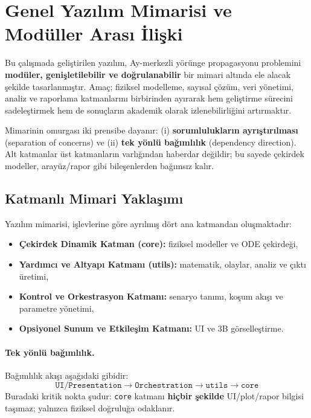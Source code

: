\newpage
\section{Genel Yazılım Mimarisi ve Modüller Arası İlişki}
\label{sec:code_structure}

Bu çalışmada geliştirilen yazılım,
Ay-merkezli yörünge propagasyonu problemini
\textbf{modüler, genişletilebilir ve doğrulanabilir}
bir mimari altında ele alacak şekilde tasarlanmıştır.
Amaç; fiziksel modelleme, sayısal çözüm, veri yönetimi, analiz ve raporlama
katmanlarını birbirinden ayırarak hem geliştirme sürecini sadeleştirmek
hem de sonuçların akademik olarak izlenebilirliğini artırmaktır.

Mimarinin omurgası iki prensibe dayanır:
(i) \textbf{sorumlulukların ayrıştırılması} (separation of concerns) ve
(ii) \textbf{tek yönlü bağımlılık} (dependency direction).
Alt katmanlar üst katmanların varlığından haberdar değildir; bu sayede
çekirdek modeller, arayüz/rapor gibi bileşenlerden bağımsız kalır.

\subsection{Katmanlı Mimari Yaklaşımı}
Yazılım mimarisi, işlevlerine göre ayrılmış dört ana katmandan oluşmaktadır:
\begin{itemize}
  \item \textbf{Çekirdek Dinamik Katman (core):} fiziksel modeller ve ODE çekirdeği,
  \item \textbf{Yardımcı ve Altyapı Katmanı (utils):} matematik, olaylar, analiz ve çıktı üretimi,
  \item \textbf{Kontrol ve Orkestrasyon Katmanı:} senaryo tanımı, koşum akışı ve parametre yönetimi,
  \item \textbf{Opsiyonel Sunum ve Etkileşim Katmanı:} UI ve 3B görselleştirme.
\end{itemize}

\paragraph{Tek yönlü bağımlılık.}
Bağımlılık akışı aşağıdaki gibidir:
\[
\texttt{UI/Presentation} \rightarrow
\texttt{Orchestration} \rightarrow
\texttt{utils} \rightarrow
\texttt{core}
\]
Buradaki kritik nokta şudur: \texttt{core} katmanı \textbf{hiçbir şekilde} UI/plot/rapor bilgisi taşımaz; yalnızca fiziksel doğruluğa odaklanır.

